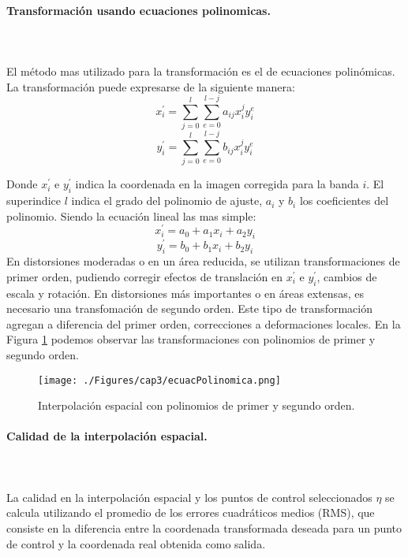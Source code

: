 \paragraph{Transformación usando ecuaciones polinomicas. }\mbox{}\\\mbox{}\\
El m\'etodo mas utilizado para la transformaci\'on es el de ecuaciones polin\'omicas.	 La transformaci\'on puede expresarse de la siguiente manera:
	\begin{equation}
	x^{'}_{i} = \sum_{j=0}^{l} \sum_{e=0}^{l-j} a_{ij}x^{j}_{i}y^{e}_{i}
	\end{equation} 
		\begin{equation}
		y^{'}_{i} = \sum_{j=0}^{l} \sum_{e=0}^{l-j} b_{ij}x^{j}_{i}y^{e}_{i}
		\end{equation} 


Donde $ x^{'}_{i} $ e $ y^{'}_{i} $ indica la coordenada en la imagen corregida para la banda $ i $. El superindice $ l $ indica el grado del polinomio de ajuste, $ a_{i} $ y $ b_{i} $ los coeficientes del polinomio. Siendo la ecuaci\'on lineal las mas simple:
	\begin{equation}
	x^{'}_{i} = a_{0}+a_{1}x_{i}+a_{2}y_{i}
	\end{equation} 
		\begin{equation}
		y^{'}_{i} = b_{0}+b_{1}x_{i}+b_{2}y_{i}
		\end{equation} 
En distorsiones moderadas o en un \'area reducida, se utilizan transformaciones de primer orden, pudiendo corregir efectos de translaci\'on en $ x^{'}_{i} $ e $ y^{'}_{i} $, cambios de escala y rotaci\'on.
En distorsiones m\'as importantes o en \'areas extensas, es necesario una transfomaci\'on de segundo orden. Este tipo de transformaci\'on agregan a diferencia del primer orden, correcciones a deformaciones locales.
En la Figura \ref{fig:intPolEcua} podemos observar las transformaciones con polinomios de primer y segundo orden.
    \begin{figure}[H]
    	\centering
    	\texttt{[image: ./Figures/cap3/ecuacPolinomica.png]}
    	\caption{Interpolaci\'on espacial con polinomios de primer y segundo orden.}
    	\label{fig:intPolEcua}
    \end{figure}
  \paragraph{Calidad de la interpolaci\'on espacial. }\mbox{}\\\mbox{}\\
 La calidad en la interpolaci\'on espacial y los puntos de control seleccionados $ \eta $ se calcula utilizando el promedio de los errores cuadráticos medios (RMS), que consiste en la diferencia entre la coordenada transformada deseada para un punto de control y la coordenada real obtenida como salida.

